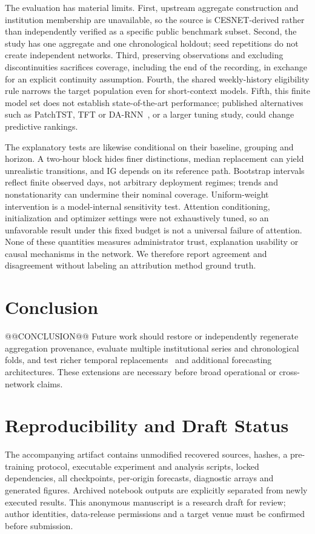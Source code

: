 \documentclass[conference]{IEEEtran}
\begin{document}
The evaluation has material limits. First, upstream aggregate construction and institution membership are unavailable, so the source is CESNET-derived rather than independently verified as a specific public benchmark subset. Second, the study has one aggregate and one chronological holdout; seed repetitions do not create independent networks. Third, preserving observations and excluding discontinuities sacrifices coverage, including the end of the recording, in exchange for an explicit continuity assumption. Fourth, the shared weekly-history eligibility rule narrows the target population even for short-context models. Fifth, this finite model set does not establish state-of-the-art performance; published alternatives such as PatchTST, TFT or DA-RNN~\cite{patchtst,tft,darnn}, or a larger tuning study, could change predictive rankings.

The explanatory tests are likewise conditional on their baseline, grouping and horizon. A two-hour block hides finer distinctions, median replacement can yield unrealistic transitions, and IG depends on its reference path. Bootstrap intervals reflect finite observed days, not arbitrary deployment regimes; trends and nonstationarity can undermine their nominal coverage. Uniform-weight intervention is a model-internal sensitivity test. Attention conditioning, initialization and optimizer settings were not exhaustively tuned, so an unfavorable result under this fixed budget is not a universal failure of attention. None of these quantities measures administrator trust, explanation usability or causal mechanisms in the network. We therefore report agreement and disagreement without labeling an attribution method ground truth.

\section{Conclusion}
@@CONCLUSION@@ Future work should restore or independently regenerate aggregation provenance, evaluate multiple institutional series and chronological folds, and test richer temporal replacements~\cite{learned_perturbations,timing} and additional forecasting architectures. These extensions are necessary before broad operational or cross-network claims.

\section*{Reproducibility and Draft Status}
The accompanying artifact contains unmodified recovered sources, hashes, a pre-training protocol, executable experiment and analysis scripts, locked dependencies, all checkpoints, per-origin forecasts, diagnostic arrays and generated figures. Archived notebook outputs are explicitly separated from newly executed results. This anonymous manuscript is a research draft for review; author identities, data-release permissions and a target venue must be confirmed before submission.
\end{document}
